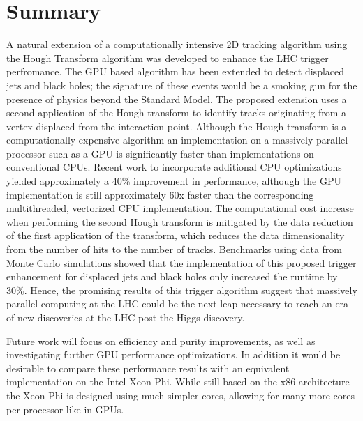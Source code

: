 \documentclass[preprint,sort&compress]{elsarticle}
\begin{document}
\section{Summary}

A natural extension of a computationally intensive 2D tracking algorithm using the Hough Transform algorithm was developed to enhance the LHC trigger perfromance.
The GPU based algorithm has been extended to detect displaced jets and black holes; the signature of these events would be a smoking gun for the presence of physics beyond the Standard Model.  The proposed extension uses 
a second application of the Hough transform to identify tracks originating from a vertex displaced from the interaction point.  Although the Hough transform is a 
computationally expensive algorithm an implementation on a massively parallel processor such as a GPU is significantly faster than implementations on conventional CPUs.  Recent work to incorporate additional CPU optimizations yielded approximately a 40\% improvement in performance, although the GPU implementation is still approximately 60x faster 
than the corresponding multithreaded, vectorized CPU implementation.  The computational cost increase when performing the second Hough transform is mitigated by the data reduction of the first application of the transform, which reduces the data dimensionality from the number of hits to the number of tracks.  Benchmarks using data from Monte Carlo simulations showed that the implementation of this proposed trigger enhancement for displaced jets and black holes only increased the runtime by 30\%. Hence, the promising results of this trigger algorithm suggest that massively parallel computing at the LHC could be the next leap necessary 
to reach an era of new discoveries at the LHC post the Higgs discovery. 

Future work will focus on efficiency and purity improvements, as well as investigating further GPU performance optimizations.  In addition it would be desirable to compare these performance results with an equivalent implementation on the Intel Xeon Phi.  While still based on the x86 architecture the Xeon Phi is designed using much simpler cores, allowing for many more cores per processor like in GPUs.



\end{document}

